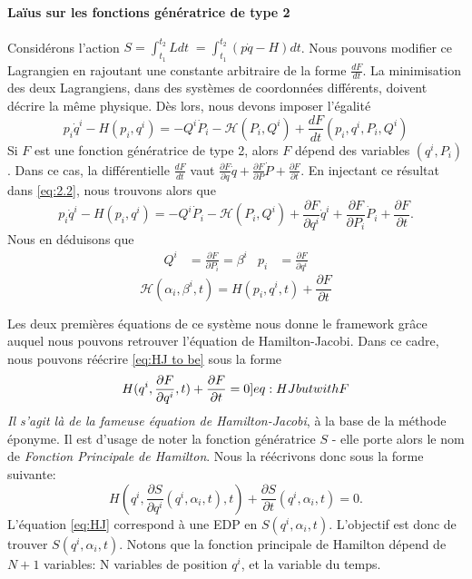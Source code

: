 \documentclass[11pt,oneside,a4paper]{article}
\newcommand{\dif}[2]{\frac{\partial #1}{\partial #2}}
\begin{document}
    \paragraph{Laïus sur les fonctions génératrice de type 2}

    Considérons l'action $S = \int_{t_1}^{t_2}Ldt \; = \int_{t_1}^{t_2}\left(p\dot{q}-H\right)dt$. Nous pouvons modifier ce Lagrangien en rajoutant une constante arbitraire de la forme $\frac{dF}{dt}$. La minimisation des deux Lagrangiens, dans des systèmes de coordonnées différents, doivent décrire la même physique. Dès lors, nous devons imposer l'égalité
    \begin{equation}
      p_i\dot{q}^i - H(p_i,q^i) = -Q^i\dot{P}_i - \mathcal{H}(P_i,Q^i)+\frac{dF}{dt}(p_i,q^i,P_i,Q^i)\label{eq:2.2}
    \end{equation}
    Si $F$ est une fonction génératrice de type 2, alors $F$ dépend des variables $(q^i,P_i)$. Dans ce cas, la différentielle $\frac{dF}{dt}$ vaut $\dif{F}{q}\dot{q}+\dif{F}{P}\dot{P}+\dif{F}{t}$. En injectant ce résultat dans \eqref{eq:2.2}, nous trouvons alors que
    \begin{equation}
      p_i\dot{q}^i - H(p_i,q^i) = -Q^i\dot{P}_i - \mathcal{H}(P_i,Q^i)+\dif{F}{q^i}\dot{q}^i+\dif{F}{P_i}\dot{P}_i+\dif{F}{t}.
    \end{equation}
    Nous en déduisons que 
    \begin{align}
      Q^i &= \dif{F}{P_i} = \beta^i & p_i &= \dif{F}{q^i}\label{eq:multiline}
    \end{align}
    \begin{equation}
      \mathcal{H}(\alpha_i,\beta^i,t) = H(p_i,q^i,t) + \dif{F}{t}
    \end{equation}

    Les deux premières équations de ce système nous donne le framework grâce auquel nous pouvons retrouver l'équation de Hamilton-Jacobi. Dans ce cadre, nous pouvons réécrire \eqref{eq:HJ to be} sous la forme
    \begin{equation}
      H(q^i,\dif{F}{q^i},t) + \dif{F}{t} = 0\label[]{eq:HJ but with F}
    \end{equation}
    \emph{Il s'agit là de la fameuse équation de Hamilton-Jacobi}, à la base de la méthode éponyme. Il est d'usage de noter la fonction génératrice $S$ - elle porte alors le nom de \emph{Fonction Principale de Hamilton}. Nous la réécrivons donc sous la forme suivante:
    \begin{equation}
      H(q^i,\dif{S}{q^i}\left(q^i,\alpha_i,t\right),t) + \dif{S}{t}\left(q^i,\alpha_i,t\right) = 0.\label{eq:HJ}
    \end{equation}
    L'équation \eqref{eq:HJ} correspond à une EDP en $S(q^i,\alpha_i,t)$. L'objectif est donc de trouver $S(q^i,\alpha_i,t)$. Notons que la fonction principale de Hamilton dépend de $N+1$ variables: N variables de position $q^i$, et la variable du temps.
\end{document}
